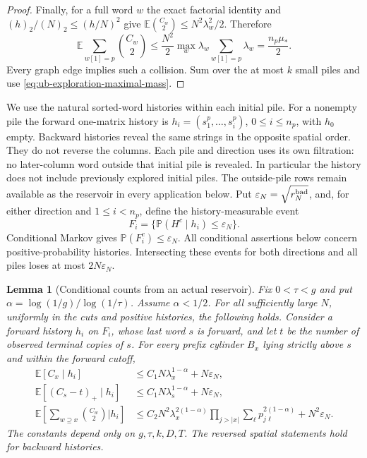 \documentclass[11pt]{article}
\numberwithin{equation}{section}
\newtheorem{lemma}[lemma]{Lemma}
\newcommand{\E}{\mathbb E}
\newcommand{\Pp}{\mathbb P}
\newcommand{\1}{\mathbf 1}
\begin{document}
\begin{proof}
Finally, for a full word \(w\) the exact factorial identity and
\((h)_2/(N)_2\le(h/N)^2\) give
\(\E\binom{C_w}{2}\le N^2\lambda_w^2/2\). Therefore
\[
 \E\sum_{w[1]=p}\binom{C_w}{2}
 \le\frac{N^2}{2}\max_w\lambda_w\sum_{w[1]=p}\lambda_w
 =\frac{n_p\mu_*}{2}.
\]
Every graph edge implies such a collision. Sum over the at most
\(k\) small piles and use \eqref{eq:ub-exploration-maximal-mass}.
\end{proof}

We use the natural sorted-word histories within each initial pile.
For a nonempty pile the forward one-matrix history is
\(h_i=(s^p_1,\ldots,s^p_i)\), \(0\le i\le n_p\), with
\(h_0\) empty. Backward histories reveal the same strings in the
opposite spatial order. They do not reverse the columns. Each pile
and direction uses its own filtration: no later-column word outside
that initial pile is revealed. In particular the history does not
include previously explored initial piles. The outside-pile rows
remain available as the reservoir in every application below.
Put
\(\varepsilon_N=\sqrt{r_N^{\rm bad}}\), and, for either direction and
\(1\le i<n_p\), define the history-measurable event
\begin{equation}
\label{eq:ub-natural-history-good}
 F_i=\{\Pp(H^c\mid h_i)\le\varepsilon_N\}.
\end{equation}
Conditional Markov gives \(\Pp(F_i^c)\le\varepsilon_N\).
All conditional assertions below concern positive-probability
histories. Intersecting these events for both directions and all
piles loses at most \(2N\varepsilon_N\).

\begin{lemma}[Conditional counts from an actual reservoir]
\label{lem:ub-reservoir-counts}
Fix \(0<\tau<g\) and put
\(\alpha=\log(1/g)/\log(1/\tau)\). Assume \(\alpha<1/2\).
For all sufficiently large \(N\), uniformly in the cuts and positive
histories, the following holds. Consider a forward history \(h_i\)
on \(F_i\), whose last word \(s\) is forward, and let \(t\) be
the number of observed terminal copies of \(s\). For every prefix
cylinder \(B_x\) lying strictly above \(s\) and within the forward
cutoff,
\begin{align}
 \E[C_x\mid h_i]
 &\le C_1N\lambda_x^{1-\alpha}+N\varepsilon_N,
 \label{eq:ub-conditional-cylinder-count}\\
 \E[(C_s-t)_+\mid h_i]
 &\le C_1N\lambda_s^{1-\alpha}+N\varepsilon_N,
 \label{eq:ub-conditional-extra-copies}\\
 \E\left[\sum_{w\supseteq x}\binom{C_w}{2}\mathrel{\Big|}h_i\right]
 &\le C_2N^2\lambda_x^{2(1-\alpha)}
       \prod_{j>|x|}\sum_\ell p_{j\ell}^{2(1-\alpha)}
       +N^2\varepsilon_N.
 \label{eq:ub-conditional-tail-collisions}
\end{align}
The constants depend only on \(g,\tau,k,D,T\). The reversed spatial
statements hold for backward histories.
\end{lemma}
\end{document}
